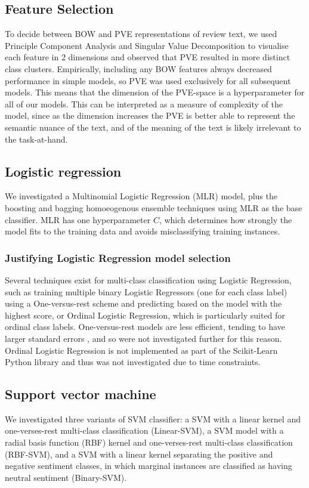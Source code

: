 \documentclass[11pt]{article}
\begin{document}
\subsection{Feature Selection} \label{subsec:method-features}

To decide between BOW and PVE representations of review text, we used Principle Component Analysis and Singular Value Decomposition to visualise each feature in 2 dimensions and observed that PVE resulted in more distinct class clusters. Empirically, including any BOW features always decreased performance in simple models, so PVE was used exclusively for all subsequent models. This means that the dimension of the PVE-space is a hyperparameter for all of our models. This can be interpreted as a measure of complexity of the model, since as the dimension increases the PVE is better able to represent the semantic nuance of the text, and of the meaning of the text is likely irrelevant to the task-at-hand.


\subsection{Logistic regression} \label{subsec:method-lr}
We investigated a Multinomial Logistic Regression (MLR) model, plus the boosting and bagging homoeogenous ensemble techniques using MLR as the base classifier. MLR has one hyperparameter $C$, which determines how strongly the model fits to the training data and avoids misclassifying training instances.

\subsubsection*{Justifying Logistic Regression model selection}
Several techniques exist for multi-class classification using Logistic Regression, such as training multiple binary Logistic Regressors (one for each class label) using a One-versus-rest scheme and predicting based on the model with the highest score, or Ordinal Logistic Regression, which is particularly suited for ordinal class labels.
One-versus-rest models are less efficient, tending to have larger standard errors \cite{zbMATH01817585}, and so were not investigated further for this reason.
Ordinal Logistic Regression is not implemented as part of the Scikit-Learn Python library and thus was not investigated due to time constraints.

\subsection{Support vector machine} \label{subsec:method-svm}
We investigated three variants of SVM classifier: a SVM with a linear kernel and one-verses-rest multi-class classification (Linear-SVM), a SVM model with a radial basis function (RBF) kernel and one-verses-rest multi-class classification (RBF-SVM), and a SVM with a linear kernel separating the positive and negative sentiment classes, in which marginal instances are classified as having neutral sentiment (Binary-SVM). 
\end{document}
